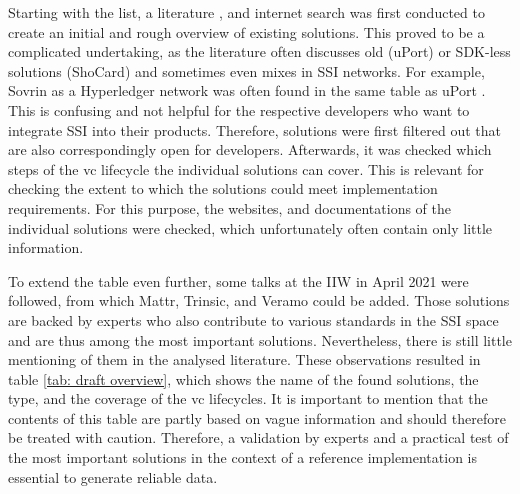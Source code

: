     Starting with the list, a literature \cite{bouras_distributed_2020, bernabe_privacy-preserving_2019, dib_decentralized_2020, dunphy_first_2018, ferdous_search_2019, kuperberg_blockchain-based_2020, van_bokkem_self-sovereign_2019, friedewald_self-sovereign_2020,gruner_relevance_2018}, and internet search was first conducted to create an initial and rough overview of existing solutions. This proved to be a complicated undertaking, as the literature often discusses old (uPort) or SDK-less solutions (ShoCard) and sometimes even mixes in \ac{SSI} networks. For example, Sovrin as a Hyperledger network was often found in the same table as uPort \cite{bouras_distributed_2020, bernabe_privacy-preserving_2019, dib_decentralized_2020, dunphy_first_2018}. This is confusing and not helpful for the respective developers who want to integrate \ac{SSI} into their products. Therefore, solutions were first filtered out that are also correspondingly open for developers. Afterwards, it was checked which steps of the \ac{vc} lifecycle \cite{sporny_verifiable_2019} the individual solutions can cover. This is relevant for checking the extent to which the solutions could meet implementation requirements. For this purpose, the websites, and documentations of the individual solutions were checked, which unfortunately often contain only little information.
    
    To extend the table even further, some talks at the \ac{IIW} in April 2021 were followed, from which Mattr, Trinsic, and Veramo could be added. Those solutions are backed by experts who also contribute to various standards in the \ac{SSI} space and are thus among the most important solutions. Nevertheless, there is still little mentioning of them in the analysed literature. These observations resulted in table \ref{tab: draft overview}, which shows the name of the found solutions, the type, and the coverage of the \ac{vc} lifecycles. It is important to mention that the contents of this table are partly based on vague information and should therefore be treated with caution. Therefore, a validation by experts and a practical test of the most important solutions in the context of a reference implementation is essential to generate reliable data.

